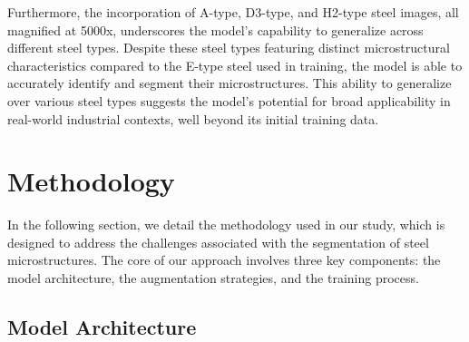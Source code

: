 \documentclass[]{article}
\begin{document}
Furthermore, the incorporation of A-type, D3-type, and H2-type steel images, all magnified at 5000x, underscores the model's capability to generalize across different steel types. Despite these steel types featuring distinct microstructural characteristics compared to the E-type steel used in training, the model is able to accurately identify and segment their microstructures. This ability to generalize over various steel types suggests the model's potential for broad applicability in real-world industrial contexts, well beyond its initial training data.

\section{Methodology}
In the following section, we detail the methodology used in our study, which is designed to address the challenges associated with the segmentation of steel microstructures. The core of our approach involves three key components: the model architecture, the augmentation strategies, and the training process.

\subsection{Model Architecture}




\end{document}
